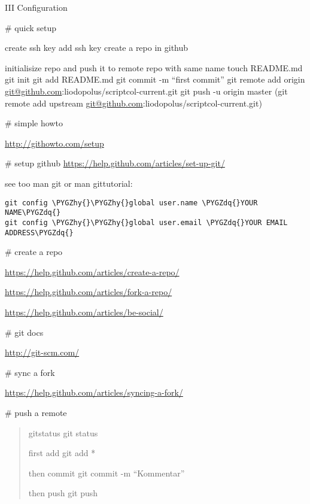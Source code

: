 \documentclass[letterpaper,10pt,english]{sphinxmanual}
\def\PYGZhy{\char`\-}
\def\PYGZdq{\char`\"}
\begin{document}
III Configuration

\# quick setup

create ssh key
add ssh key
create a repo in github

initialisize repo and push it to remote repo with same name
touch README.md
git init
git add README.md
git commit -m ``first commit''
git remote add origin \href{mailto:git@github.com}{git@github.com}:liodopolus/scriptcol-current.git
git push -u origin master
(git remote add upstream \href{mailto:git@github.com}{git@github.com}:liodopolus/scriptcol-current.git)

\# simple howto

\href{http://githowto.com/setup}{http://githowto.com/setup}

\# setup github
\href{https://help.github.com/articles/set-up-git/}{https://help.github.com/articles/set-up-git/}

see too man git or man gittutorial:

\begin{Verbatim}[commandchars=\\\{\}]
git config \PYGZhy{}\PYGZhy{}global user.name \PYGZdq{}YOUR NAME\PYGZdq{}
git config \PYGZhy{}\PYGZhy{}global user.email \PYGZdq{}YOUR EMAIL ADDRESS\PYGZdq{}
\end{Verbatim}

\# create a repo

\begin{DUlineblock}{0em}
\item[] \href{https://help.github.com/articles/create-a-repo/}{https://help.github.com/articles/create-a-repo/}
\item[] \href{https://help.github.com/articles/fork-a-repo/}{https://help.github.com/articles/fork-a-repo/}
\item[] \href{https://help.github.com/articles/be-social/}{https://help.github.com/articles/be-social/}
\end{DUlineblock}

\# git docs

\href{http://git-scm.com/}{http://git-scm.com/}

\# sync a fork

\href{https://help.github.com/articles/syncing-a-fork/}{https://help.github.com/articles/syncing-a-fork/}

\# push a remote
\begin{quote}

gitstatus
git status

first add
git add *

then commit
git commit -m ``Kommentar''

then push
git push
\end{quote}
\end{document}
